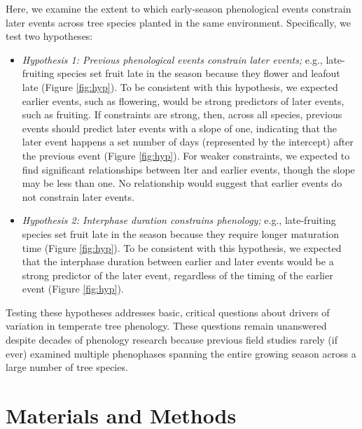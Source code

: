 \documentclass{article}
\begin{document}
\par Here, we examine the extent to which early-season phenological events constrain later events across tree species planted in the same environment. Specifically, we test two hypotheses:
\begin{itemize}
\item \textit{Hypothesis 1: Previous phenological events constrain later events;} e.g., late-fruiting species set fruit late in the season because they flower and leafout late  (Figure \ref{fig:hyp}). To be consistent with this hypothesis, we expected earlier events, such as flowering, would be strong predictors of later events, such as fruiting. If constraints are strong, then, across all species, previous events should predict later events with a slope of one, indicating that the later event happens a set number of days (represented by the intercept) after the previous event (Figure \ref{fig:hyp}). For weaker constraints, we expected to find significant relationships between lter and earlier events, though the slope may be less than one.  No relationship would suggest that earlier events do not constrain later events.

\item \textit{Hypothesis 2: Interphase duration constrains phenology;} e.g., late-fruiting species set fruit late in the season because they require longer maturation time (Figure \ref{fig:hyp}). To be consistent with this hypothesis, we expected that the interphase duration between earlier and later events would be a strong predictor of the later event, regardless of the timing  of the earlier event (Figure \ref{fig:hyp}).
\end{itemize}
Testing these hypotheses addresses basic, critical questions about drivers of variation in temperate tree phenology. These questions remain unanswered despite decades of phenology research because previous field studies rarely (if ever) examined multiple phenophases spanning the entire growing season across a large number of tree species. 
\section* {Materials and Methods}
\end{document}

